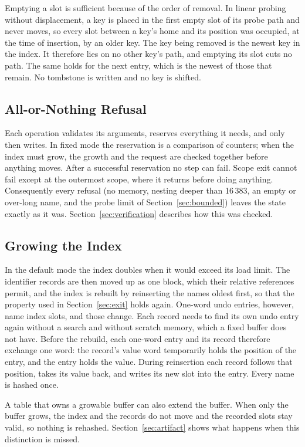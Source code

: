 Emptying a slot is sufficient because of the order of removal. In linear probing without displacement, a key is placed in the first empty slot of its probe path and never moves, so every slot between a key's home and its position was occupied, at the time of insertion, by an older key. The key being removed is the newest key in the index. It therefore lies on no other key's path, and emptying its slot cuts no path. The same holds for the next entry, which is the newest of those that remain. No tombstone is written and no key is shifted.

\subsection{All-or-Nothing Refusal}
Each operation validates its arguments, reserves everything it needs, and only then writes. In fixed mode the reservation is a comparison of counters; when the index must grow, the growth and the request are checked together before anything moves. After a successful reservation no step can fail. Scope exit cannot fail except at the outermost scope, where it returns before doing anything. Consequently every refusal (no memory, nesting deeper than 16\,383, an empty or over-long name, and the probe limit of Section~\ref{sec:bounded}) leaves the state exactly as it was. Section~\ref{sec:verification} describes how this was checked.

\subsection{Growing the Index}
\label{sec:rebuild}
In the default mode the index doubles when it would exceed its load limit. The identifier records are then moved up as one block, which their relative references permit, and the index is rebuilt by reinserting the names oldest first, so that the property used in Section~\ref{sec:exit} holds again. One-word undo entries, however, name index slots, and those change. Each record needs to find its own undo entry again without a search and without scratch memory, which a fixed buffer does not have. Before the rebuild, each one-word entry and its record therefore exchange one word: the record's value word temporarily holds the position of the entry, and the entry holds the value. During reinsertion each record follows that position, takes its value back, and writes its new slot into the entry. Every name is hashed once.

A table that owns a growable buffer can also extend the buffer. When only the buffer grows, the index and the records do not move and the recorded slots stay valid, so nothing is rehashed. Section~\ref{sec:artifact} shows what happens when this distinction is missed.

